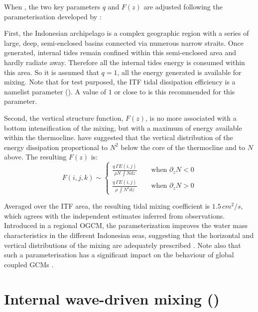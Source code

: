 \documentclass[../main/NEMO_manual]{subfiles}
\begin{document}
When , the two key parameters $q$ and $F(z)$ are adjusted following
the parameterisation developed by \citet{Koch-Larrouy_al_GRL07}:

First, the Indonesian archipelago is a complex geographic region with a series of
large, deep, semi-enclosed basins connected via numerous narrow straits.
Once generated, internal tides remain confined within this semi-enclosed area and hardly radiate away.
Therefore all the internal tides energy is consumed within this area.
So it is assumed that $q = 1$, \ie all the energy generated is available for mixing.
Note that for test purposed, the ITF tidal dissipation efficiency is a namelist parameter ().
A value of $1$ or close to is this recommended for this parameter.

Second, the vertical structure function, $F(z)$, is no more associated with a bottom intensification of the mixing,
but with a maximum of energy available within the thermocline.
\citet{Koch-Larrouy_al_GRL07} have suggested that the vertical distribution of
the energy dissipation proportional to $N^2$ below the core of the thermocline and to $N$ above. 
The resulting $F(z)$ is:
\[
  F(i,j,k) \sim     \left\{
    \begin{aligned}
      \frac{q\,\Gamma E(i,j) } {\rho N \, \int N     dz}    \qquad \text{when $\partial_z N < 0$} \\
      \frac{q\,\Gamma E(i,j) } {\rho     \, \int N^2 dz}    \qquad \text{when $\partial_z N > 0$}
    \end{aligned}
  \right.
\]

Averaged over the ITF area, the resulting tidal mixing coefficient is $1.5\,cm^2/s$, 
which agrees with the independent estimates inferred from observations.
Introduced in a regional OGCM, the parameterization improves the water mass characteristics in
the different Indonesian seas, suggesting that the horizontal and vertical distributions of
the mixing are adequately prescribed \citep{Koch-Larrouy_al_GRL07, Koch-Larrouy_al_OD08a, Koch-Larrouy_al_OD08b}.
Note also that such a parameterisation has a significant impact on the behaviour of
global coupled GCMs \citep{Koch-Larrouy_al_CD10}.

\section{Internal wave-driven mixing (\protect{})}
\label{sec:ZDF_tmx_new}
\end{document}
